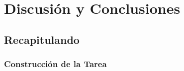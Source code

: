 
\chapter{Discusión y Conclusiones} %

\label{Cap_Disc} %


\section{Recapitulando}

\subsection{Construcción de la Tarea}
